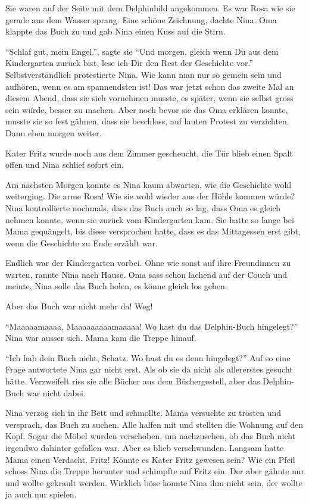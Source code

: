 \begin{mdframed}[style=mystyle]
Sie waren auf der Seite mit dem Delphinbild angekommen. Es war Rosa wie sie gerade aus dem Wasser sprang. Eine schöne Zeichnung, dachte Nina. Oma klappte das Buch zu und gab Nina einen Kuss auf die Stirn.

\enquote{Schlaf gut, mein Engel.}, sagte sie \enquote{Und morgen, gleich wenn Du aus dem Kindergarten zurück bist, lese ich Dir den Rest der Geschichte vor.} Selbstverständlich protestierte Nina. Wie kann man nur so gemein sein und aufhören, wenn es am spannendsten ist! Das war jetzt schon das zweite Mal an diesem Abend, dass sie sich vornehmen musste, es später, wenn sie selbst gross sein würde, besser zu machen. Aber noch bevor sie das Oma erklären konnte, musste sie so fest gähnen, dass sie beschloss, auf lauten Protest zu verzichten. Dann eben morgen weiter.

Kater Fritz wurde noch aus dem Zimmer gescheucht, die Tür blieb einen Spalt offen und Nina schlief sofort ein.


Am nächsten Morgen konnte es Nina kaum abwarten, wie die Geschichte wohl weiterging. Die arme Rosa! Wie sie wohl wieder aus der Höhle kommen würde? Nina kontrollierte nochmals, dass das Buch auch so lag, dass Oma es gleich nehmen konnte, wenn sie zurück vom Kindergarten kam. Sie hatte so lange bei Mama gequängelt, bis diese versprochen hatte, dass es das Mittagessen erst gibt, wenn die Geschichte zu Ende erzählt war.

Endlich war der Kindergarten vorbei. Ohne wie sonst auf ihre Freundinnen zu warten, rannte Nina nach Hause. Oma sass schon lachend auf der Couch und meinte, Nina solle das Buch holen, es könne gleich los gehen.

Aber das Buch war nicht mehr da! Weg!

\enquote{Maaaaamaaaa, Maaaaaaaaamaaaaa! Wo hast du das Delphin-Buch hingelegt?} Nina war ausser sich. Mama kam die Treppe hinauf.

\enquote{Ich hab dein Buch nicht, Schatz. Wo hast du es denn hingelegt?} Auf so eine Frage antwortete Nina gar nicht erst. Als ob sie da nicht als allererstes gesucht hätte. Verzweifelt riss sie alle Bücher aus dem Büchergestell, aber das Delphin-Buch war nicht dabei.

Nina verzog sich in ihr Bett und schmollte. Mama versuchte zu trösten und versprach, das Buch zu suchen. Alle halfen mit und stellten die Wohnung auf den Kopf. Sogar die Möbel wurden verschoben, um nachzusehen, ob das Buch nicht irgendwo dahinter gefallen war. Aber es blieb verschwunden.  Langsam hatte Mama einen Verdacht. Fritz! Könnte es Kater Fritz gewesen sein? Wie ein Pfeil schoss Nina die Treppe herunter und schimpfte auf Fritz ein. Der aber gähnte nur und wollte gekrault werden. Wirklich böse konnte Nina ihm nicht sein, der wollte ja auch nur spielen.


\end{mdframed}
